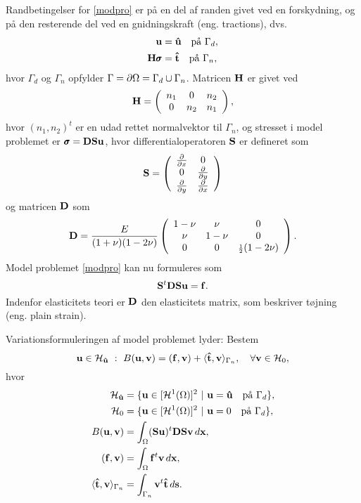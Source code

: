 Randbetingelser for \eqref{modpro} er på en del af randen givet ved en
forskydning, og på den resterende del ved en gnidningskraft (eng. tractions), dvs.
\begin{align}
  {\bf u} &= {\bf \hat{u}} \quad \text{på $\Gamma_d$}, \\
  {\bf H}{\pmb\sigma} &= {\bf \hat{t}} \quad \text{på $\Gamma_n$}, \label{bcstress}
\end{align}
hvor $\Gamma_d$ og $\Gamma_n$ opfylder $\Gamma =\partial\Omega =
\Gamma_d\cup\Gamma_n$. Matricen ${\bf H}$ er givet ved
\begin{equation}
{\bf H}=\left(
  \begin{array}{ccc}
    n_1 & 0 & n_2 \\
    0 & n_2 & n_1
  \end{array}\right),
\end{equation}
hvor $(n_1,n_2)^t$ er en udad rettet normalvektor til $\Gamma_n$, og
stresset i model problemet er $\pmb{\sigma}={\bf DSu}$, hvor
differentialoperatoren $\bf S$ er defineret som
\begin{equation}
{\bf S}=
\left(\begin{array}{cc}
  \frac{\partial}{\partial x} & 0 \\
  0 & \frac{\partial}{\partial y} \\
  \frac{\partial}{\partial y} & \frac{\partial}{\partial x}
\end{array}\right)
\end{equation}
og matricen $\bf D$ som
\begin{equation}
{\bf D}=
\frac{E}{(1+\nu)(1-2\nu)}
\left(\begin{array}{ccc}
  1-\nu & \nu & 0 \\
  \nu & 1-\nu & 0 \\
  0 & 0 & {\scriptstyle \frac{1}{2}} (1-2\nu)
\end{array}\right).
\end{equation}
Model problemet \eqref{modpro} kan nu formuleres som
\begin{equation}
  {\bf S}^t{\bf DSu} = {\bf f}.
\end{equation}
Indenfor elasticitets teori er $\bf D$ den elasticitets matrix, som
beskriver tøjning (eng. plain strain).

Variationsformuleringen af model problemet lyder: Bestem
\begin{equation}
  {\bf u}\in\mathcal H_{\bf\hat{u}} \ : \
  B({\bf u},{\bf v}) = ({\bf f},{\bf v}) +
  \langle{\bf \hat{t}}, {\bf v}\rangle_{\Gamma_n}, \quad \forall {\bf v}\in\mathcal H_0 ,
\end{equation}
hvor
\begin{align}
  \mathcal H_{\bf\hat{u}} &=
    \{ {\bf u} \in [ \mathcal H^1(\Omega) ]^2 \ | \ {\bf u} =
    {\bf\hat{u}} \quad \text{på $\Gamma_d$} \}, \\
  \mathcal H_0 &= \{ {\bf u} \in [ \mathcal H^1(\Omega) ]^2 \ | \ {\bf u} =
    0 \quad \text{på $\Gamma_d$} \}, \\
  B({\bf u},{\bf v}) &=
    \int_\Omega ({\bf Su})^t{\bf DSv}\, d{\bf x}, \\
  ({\bf f},{\bf v}) &= \int_\Omega {\bf f}^t{\bf v}\, d{\bf x}, \\
  \langle{\bf \hat{t}}, {\bf v}\rangle_{\Gamma_n} &= \int_{\Gamma_n}
    {\bf v}^t{\bf \hat{t}}\, d{\bf s}.
\end{align}

